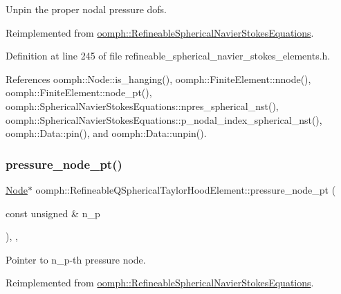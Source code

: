Unpin the proper nodal pressure dofs. 



Reimplemented from \hyperlink{classoomph_1_1RefineableSphericalNavierStokesEquations_a0041d52514b3020466b88bc63a5f749a}{oomph\+::\+Refineable\+Spherical\+Navier\+Stokes\+Equations}.



Definition at line 245 of file refineable\+\_\+spherical\+\_\+navier\+\_\+stokes\+\_\+elements.\+h.



References oomph\+::\+Node\+::is\+\_\+hanging(), oomph\+::\+Finite\+Element\+::nnode(), oomph\+::\+Finite\+Element\+::node\+\_\+pt(), oomph\+::\+Spherical\+Navier\+Stokes\+Equations\+::npres\+\_\+spherical\+\_\+nst(), oomph\+::\+Spherical\+Navier\+Stokes\+Equations\+::p\+\_\+nodal\+\_\+index\+\_\+spherical\+\_\+nst(), oomph\+::\+Data\+::pin(), and oomph\+::\+Data\+::unpin().

\mbox{\label{classoomph_1_1RefineableQSphericalTaylorHoodElement_a41a9632ac4bafa843dd8e3cf291ab390}} 
\subsubsection{\texorpdfstring{pressure\+\_\+node\+\_\+pt()}{pressure\_node\_pt()}}
{\footnotesize\ttfamily \hyperlink{classoomph_1_1Node}{Node}$\ast$ oomph\+::\+Refineable\+Q\+Spherical\+Taylor\+Hood\+Element\+::pressure\+\_\+node\+\_\+pt (\begin{DoxyParamCaption}\item[{const unsigned \&}]{n\+\_\+p }\end{DoxyParamCaption})\hspace{0.3cm}{\ttfamily [inline]}, {\ttfamily [private]}, {\ttfamily [virtual]}}



Pointer to n\+\_\+p-\/th pressure node. 



Reimplemented from \hyperlink{classoomph_1_1RefineableSphericalNavierStokesEquations_a1daddea2d11bb46db3e6aef3843b288d}{oomph\+::\+Refineable\+Spherical\+Navier\+Stokes\+Equations}.



